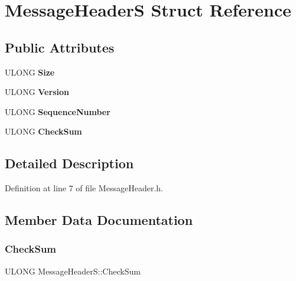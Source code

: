 \hypertarget{struct_message_header_s}{}\section{Message\+HeaderS Struct Reference}
\label{struct_message_header_s}
\subsection*{Public Attributes}
\begin{DoxyCompactItemize}
\item 
\mbox{\label{struct_message_header_s_aadf726500ef4da91aade01e7ce77f1b6}} 
U\+L\+O\+NG {\bfseries Size}
\item 
\mbox{\label{struct_message_header_s_ad84ac3fe8c24c33ed7bedf9f0799d171}} 
U\+L\+O\+NG {\bfseries Version}
\item 
\mbox{\label{struct_message_header_s_abea32cb680a03f167f06cd234602923d}} 
U\+L\+O\+NG {\bfseries Sequence\+Number}
\item 
\mbox{\label{struct_message_header_s_a6c63bfaa9ea89f9869157beb59f0c160}} 
U\+L\+O\+NG {\bfseries Check\+Sum}
\end{DoxyCompactItemize}


\subsection{Detailed Description}


Definition at line 7 of file Message\+Header.\+h.



\subsection{Member Data Documentation}
\mbox{\label{struct_message_header_s_a6c63bfaa9ea89f9869157beb59f0c160}} 
\subsubsection{\texorpdfstring{Check\+Sum}{CheckSum}}
{\footnotesize\ttfamily U\+L\+O\+NG Message\+Header\+S\+::\+Check\+Sum}



